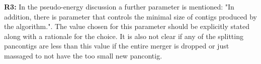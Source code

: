 \documentclass[aps,rmp,onecolumn]{revtex4-1}
\newcommand{\Marco}[1]{{\color{gray}Marco: #1}}
\newcommand{\Liam}[1]{{\color{teal}Liam: #1}}
\newcommand{\reviewer}[2]{\textbf{#1:} #2\vskip 5mm}
\begin{document}
\reviewer{R3}{In the pseudo-energy discussion a further parameter is mentioned: "In addition, there is parameter that controls the minimal size of contigs produced by the algorithm.". The value chosen for this parameter should be explicitly stated along with a rationale for the choice. It is also not clear if any of the splitting pancontigs are less than this value if the entire merger is dropped or just massaged to not have the too small new pancontig.}
\end{document}

